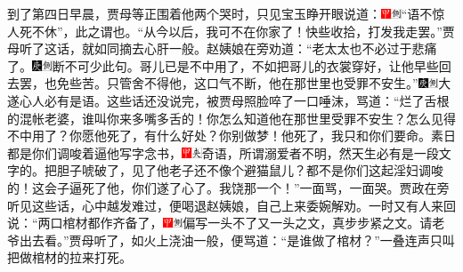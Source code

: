 到了第四日早晨，贾母等正围着他两个哭时，只见宝玉睁开眼说道：{\includegraphics[width=3mm]{../Images/00002}\includegraphics[width=3mm]{../Images/00011}\footnotesize \kaishu ``语不惊人死不休''，此之谓也。}``从今以后，我可不在你家了！快些收拾，打发我走罢。''贾母听了这话，就如同摘去心肝一般。赵姨娘在旁劝道：``老太太也不必过于悲痛了。{\includegraphics[width=3mm]{../Images/00004}\includegraphics[width=3mm]{../Images/00011}\footnotesize \kaishu 断不可少此句。}哥儿已是不中用了，不如把哥儿的衣裳穿好，让他早些回去罢，也免些苦。只管舍不得他，这口气不断，他在那世里也受罪不安生。''{\includegraphics[width=3mm]{../Images/00004}\includegraphics[width=3mm]{../Images/00011}\footnotesize \kaishu 大遂心人必有是语。}这些话还没说完，被贾母照脸啐了一口唾沫，骂道：``烂了舌根的混帐老婆，谁叫你来多嘴多舌的！你怎么知道他在那世里受罪不安生？怎么见得不中用了？你愿他死了，有什么好处？你别做梦！他死了，我只和你们要命。素日都是你们调唆着逼他写字念书，{\includegraphics[width=3mm]{../Images/00002}\includegraphics[width=3mm]{../Images/00012}\footnotesize \kaishu 奇语，所谓溺爱者不明，然天生必有是一段文字的。}把胆子唬破了，见了他老子还不像个避猫鼠儿？都不是你们这起淫妇调唆的！这会子逼死了他，你们遂了心了。我饶那一个！''一面骂，一面哭。贾政在旁听见这些话，心中越发难过，便喝退赵姨娘，自己上来委婉解劝。一时又有人来回说：``两口棺材都作齐备了，{\includegraphics[width=3mm]{../Images/00002}\includegraphics[width=3mm]{../Images/00011}\footnotesize \kaishu 偏写一头不了又一头之文，真步步紧之文。}请老爷出去看。''贾母听了，如火上浇油一般，便骂道：``是谁做了棺材？''一叠连声只叫把做棺材的拉来打死。

